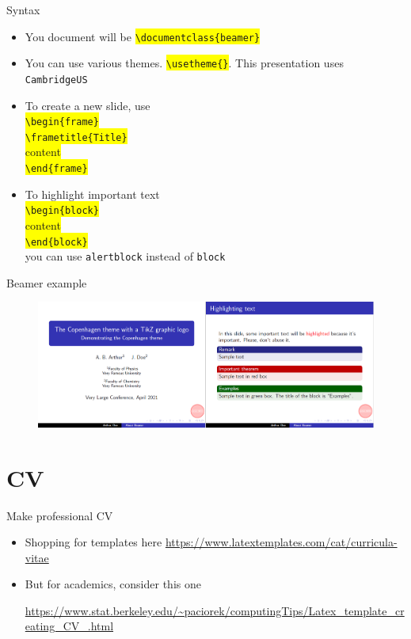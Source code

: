 \documentclass[
11pt, %
]{beamer}
\begin{document}
	\begin{frame}{Syntax}
	\begin{itemize}
		\item You document will be \colorbox{yellow}{\texttt{\textbackslash documentclass\{beamer\}}}
		\item You can use various themes. \colorbox{yellow}{\texttt{\textbackslash usetheme\{\}}}. This presentation uses \texttt{CambridgeUS}
		\item To create a new slide, use \\
		\colorbox{yellow}{\texttt{\textbackslash begin\{frame\}}} \\
		\colorbox{yellow}{\texttt{\textbackslash frametitle\{Title\}}} \\
		\colorbox{yellow}{content} \\
		\colorbox{yellow}{\texttt{\textbackslash end\{frame\}}}
		\item To highlight important text \\
		\colorbox{yellow}{\texttt{\textbackslash begin\{block\}}} \\
		\colorbox{yellow}{content} \\
		\colorbox{yellow}{\texttt{\textbackslash end\{block\}}} \\
		you can use \texttt{alertblock} instead of \texttt{block}
	\end{itemize}
	\end{frame}
	
	\begin{frame}{Beamer example}
		\begin{figure}
			\includegraphics[scale=0.25]{beam.png}
		\end{figure}
	\end{frame}
	
	\section{CV}
	\begin{frame}{Make professional CV}
		\begin{itemize}
		\item Shopping for templates here \url{https://www.latextemplates.com/cat/curricula-vitae}
		
		\item But for academics, consider this one
		
		\url{https://www.stat.berkeley.edu/~paciorek/computingTips/Latex_template_creating_CV_.html}
		
		\end{itemize}
	\end{frame}
	
\end{document}
